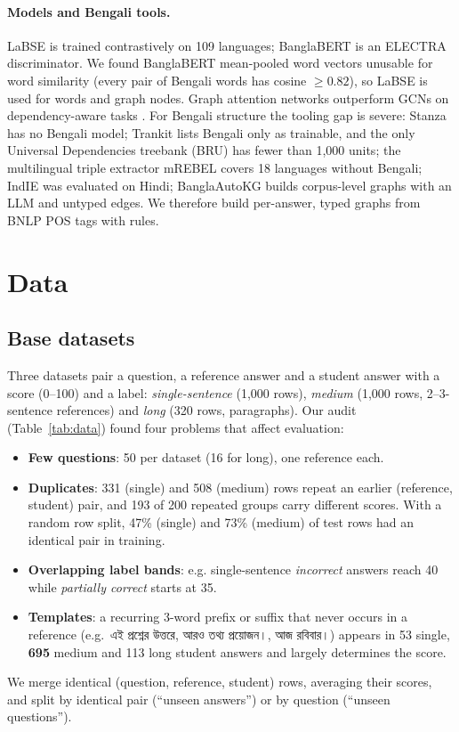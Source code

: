 \documentclass[10pt,a4paper,twocolumn]{article}
\newcommand{\bn}[1]{{\bengalifont #1}}
\begin{document}
\paragraph{Models and Bengali tools.}
LaBSE \citep{labse} is trained contrastively on 109 languages; BanglaBERT
\citep{banglabert} is an ELECTRA discriminator. We found BanglaBERT
mean-pooled word vectors unusable for word similarity (every pair of Bengali
words has cosine $\geq 0.82$), so LaBSE is used for words and graph nodes.
Graph attention networks \citep{gat} outperform GCNs \citep{gcn} on
dependency-aware tasks \citep{zhang2019}. For Bengali structure the tooling
gap is severe: Stanza \citep{stanza} has no Bengali model; Trankit
\citep{trankit} lists Bengali only as trainable, and the only Universal
Dependencies treebank (BRU) has fewer than 1,000 units; the multilingual
triple extractor mREBEL \citep{mrebel} covers 18 languages without Bengali;
IndIE \citep{indie} was evaluated on Hindi; BanglaAutoKG \citep{banglaautokg}
builds corpus-level graphs with an LLM and untyped edges. We therefore build
per-answer, typed graphs from BNLP POS tags with rules.

\section{Data}\label{sec:data}
\subsection{Base datasets}
Three datasets pair a question, a reference answer and a student answer with
a score (0--100) and a label: \emph{single-sentence} (1,000 rows),
\emph{medium} (1,000 rows, 2--3-sentence references) and \emph{long} (320
rows, paragraphs). Our audit (Table~\ref{tab:data}) found four problems that
affect evaluation:
\begin{itemize}\setlength{\itemsep}{0pt}
\item \textbf{Few questions}: 50 per dataset (16 for long), one reference each.
\item \textbf{Duplicates}: 331 (single) and 508 (medium) rows repeat an earlier
  (reference, student) pair, and 193 of 200 repeated groups carry different
  scores. With a random row split, 47\% (single) and 73\% (medium) of test
  rows had an identical pair in training.
\item \textbf{Overlapping label bands}: e.g. single-sentence \emph{incorrect}
  answers reach 40 while \emph{partially correct} starts at 35.
\item \textbf{Templates}: a recurring 3-word prefix or suffix that never occurs
  in a reference (e.g.\ \bn{এই প্রশ্নের উত্তরে}, \bn{আরও তথ্য প্রয়োজন।},
  \bn{আজ রবিবার।}) appears in 53 single, \textbf{695} medium and 113 long
  student answers and largely determines the score.
\end{itemize}
We merge identical (question, reference, student) rows, averaging their
scores, and split by identical pair (``unseen answers'') or by question
(``unseen questions'').
\end{document}
